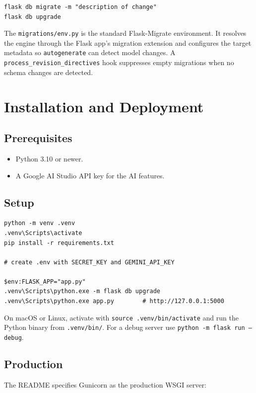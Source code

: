 \documentclass[11pt,a4paper]{article}
\newcommand{\code}[1]{\texttt{#1}}
\begin{document}
\begin{lstlisting}[style=txt,caption={Migration workflow}]
flask db migrate -m "description of change"
flask db upgrade
\end{lstlisting}

The \code{migrations/env.py} is the standard Flask-Migrate environment. It
resolves the engine through the Flask app's migration extension and configures
the target metadata so \code{autogenerate} can detect model changes. A
\code{process\_revision\_directives} hook suppresses empty migrations when no
schema changes are detected.

\section{Installation and Deployment}

\subsection{Prerequisites}
\begin{itemize}[nosep]
  \item Python 3.10 or newer.
  \item A Google AI Studio API key for the AI features.
\end{itemize}

\subsection{Setup}
\begin{lstlisting}[style=txt,caption={Local setup (Windows PowerShell)}]
python -m venv .venv
.venv\Scripts\activate
pip install -r requirements.txt

# create .env with SECRET_KEY and GEMINI_API_KEY

$env:FLASK_APP="app.py"
.venv\Scripts\python.exe -m flask db upgrade
.venv\Scripts\python.exe app.py        # http://127.0.0.1:5000
\end{lstlisting}

On macOS or Linux, activate with \code{source .venv/bin/activate} and run the
Python binary from \code{.venv/bin/}. For a debug server use
\code{python -m flask run --debug}.

\subsection{Production}
The README specifies Gunicorn as the production WSGI server:
\end{document}
